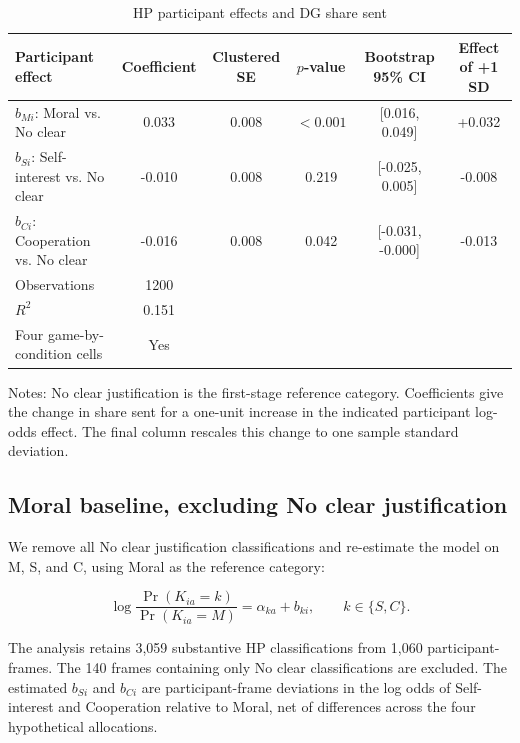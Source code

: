 \documentclass{article}
\begin{document}
\begin{table}[H]
\centering
\caption{HP participant effects and DG share sent}
\label{tab:hp_weights_dg}
\begin{tabular}{lccccc}
\toprule
Participant effect & Coefficient & Clustered SE & $p$-value & Bootstrap 95\% CI & Effect of +1 SD \\
\midrule
$b_{Mi}$: Moral vs. No clear & 0.033 & 0.008 & $<0.001$ & [0.016, 0.049] & +0.032 \\
$b_{Si}$: Self-interest vs. No clear & -0.010 & 0.008 & 0.219 & [-0.025, 0.005] & -0.008 \\
$b_{Ci}$: Cooperation vs. No clear & -0.016 & 0.008 & 0.042 & [-0.031, -0.000] & -0.013 \\
\midrule
Observations & 1200 & & & & \\
$R^2$ & 0.151 & & & & \\
Four game-by-condition cells & Yes & & & & \\
\bottomrule
\end{tabular}
\begin{flushleft}
\footnotesize Notes: No clear justification is the first-stage reference category. Coefficients give the change in share sent for a one-unit increase in the indicated participant log-odds effect. The final column rescales this change to one sample standard deviation.
\end{flushleft}
\end{table}

\subsection{Moral baseline, excluding No clear justification}

We remove all No clear justification classifications and re-estimate the model on M, S, and C, using Moral as the reference category:

\begin{equation}
    \log\frac{\Pr(K_{ia}=k)}{\Pr(K_{ia}=M)}=\alpha_{ka}+b_{ki},
    \qquad k\in\{S,C\}.
\end{equation}

The analysis retains 3,059 substantive HP classifications from 1,060 participant-frames. The 140 frames containing only No clear classifications are excluded. The estimated $b_{Si}$ and $b_{Ci}$ are participant-frame deviations in the log odds of Self-interest and Cooperation relative to Moral, net of differences across the four hypothetical allocations.
\end{document}
